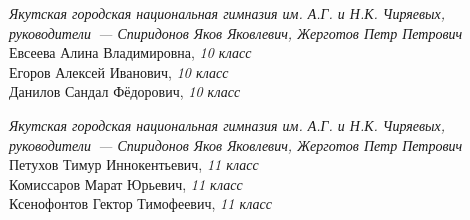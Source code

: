 \begin{description}[style=unboxed, labelwidth=\linewidth, font=\bfseries, listparindent=0pt, leftmargin=15pt, parsep=0pt]
\item[ЯГНГ 10]
\textit{Якутская городская национальная гимназия им. А.Г. и Н.К. Чиряевых, \\
руководители~— Спиридонов Яков Яковлевич, Жерготов Петр Петрович} \\
Евсеева Алина Владимировна, \textit{10 класс} \\
Егоров Алексей Иванович, \textit{10 класс} \\
Данилов Сандал Фёдорович, \textit{10 класс}

\item[ЯГНГ 11]
\textit{Якутская городская национальная гимназия им. А.Г. и Н.К. Чиряевых, \\
руководители~— Спиридонов Яков Яковлевич, Жерготов Петр Петрович} \\
Петухов Тимур Иннокентьевич, \textit{11 класс} \\
Комиссаров Марат Юрьевич, \textit{11 класс} \\
Ксенофонтов Гектор Тимофеевич, \textit{11 класс}

\end{description}